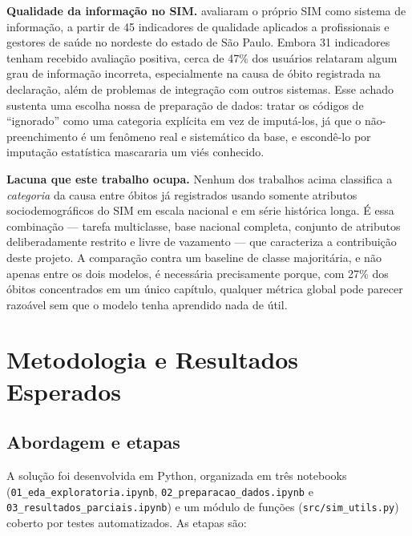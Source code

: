 \documentclass[12pt]{article}
\begin{document}
\textbf{Qualidade da informação no SIM.} \cite{morais2017} avaliaram o
próprio SIM como sistema de informação, a partir de 45 indicadores de
qualidade aplicados a profissionais e gestores de saúde no nordeste do estado
de São Paulo. Embora 31 indicadores tenham recebido avaliação positiva, cerca
de 47\% dos usuários relataram algum grau de informação incorreta,
especialmente na causa de óbito registrada na declaração, além de problemas de
integração com outros sistemas. Esse achado sustenta uma escolha nossa de
preparação de dados: tratar os códigos de ``ignorado'' como uma categoria
explícita em vez de imputá-los, já que o não-preenchimento é um fenômeno real
e sistemático da base, e escondê-lo por imputação estatística mascararia um
viés conhecido.

\textbf{Lacuna que este trabalho ocupa.} Nenhum dos trabalhos acima
classifica a \emph{categoria} da causa entre óbitos já registrados usando
somente atributos sociodemográficos do SIM em escala nacional e em série
histórica longa. É essa combinação --- tarefa multiclasse, base nacional
completa, conjunto de atributos deliberadamente restrito e livre de vazamento
--- que caracteriza a contribuição deste projeto. A comparação contra um
baseline de classe majoritária, e não apenas entre os dois modelos, é
necessária precisamente porque, com 27\% dos óbitos concentrados em um único
capítulo, qualquer métrica global pode parecer razoável sem que o modelo
tenha aprendido nada de útil.

\section{Metodologia e Resultados Esperados}
\label{sec:metodologia}

\subsection{Abordagem e etapas}

A solução foi desenvolvida em Python, organizada em três notebooks
(\texttt{01\_eda\_exploratoria.ipynb}, \texttt{02\_preparacao\_dados.ipynb} e
\texttt{03\_resultados\_parciais.ipynb}) e um módulo de funções
(\texttt{src/sim\_utils.py}) coberto por testes automatizados. As etapas são:
\end{document}

